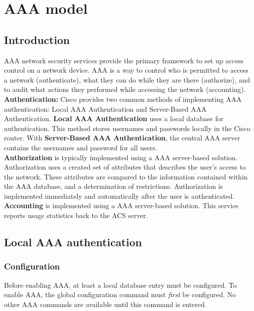 \chapter{AAA model}

\section{Introduction}

AAA network security services provide the primary framework to set up access control on a network device. AAA is a way to control who is permitted to access a network (authenticate), what they can do while they are there (authorize), and to audit what actions they performed while accessing the network (accounting).\\

\textbf{Authentication:} Cisco provides two common methods of implementing AAA authentication: Local AAA Authentication and Server-Based AAA Authentication. \textbf{Local AAA Authentication} uses a local database for authentication. This method stores usernames and passwords locally in the Cisco router. With \textbf{Server-Based AAA Authentication}, the central AAA server contains the usernames and password for all users.\\

\textbf{Authorization} is typically implemented using a AAA server-based solution. Authorization uses a created set of attributes that describes the user’s access to the network. These attributes are compared to the information contained within the AAA database, and a determination of restrictions. Authorization is implemented immediately and automatically after the user is authenticated.\\

\textbf{Accounting} is implemented using a AAA server-based solution. This service reports usage statistics back to the ACS server. 

\section{Local AAA authentication}

\subsection{Configuration}

Before enabling AAA, at least a local database entry must be configured. To enable AAA, the  global configuration command must \emph{first} be configured. No other AAA commands are available until this command is entered.\\

